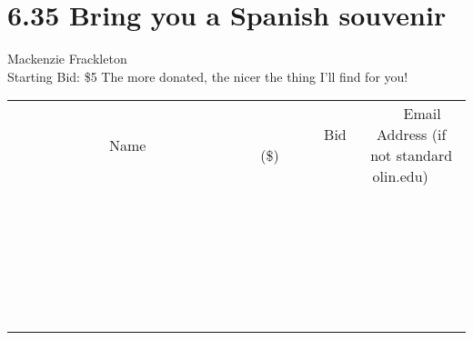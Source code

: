 \documentclass[11pt]{article}
\begin{document}
\section*{6.35 Bring you a Spanish souvenir }
Mackenzie Frackleton
\\
Starting Bid: \$5
\newline
The more donated, the nicer the thing I'll find for you!
\\[6ex]
\begin{tabular}{c c c}
~~~~~~~~~~~~~Name~~~~~~~~~~~~~ & ~~~~~~~~~Bid (\$)~~~~~~~~~  & ~~~Email Address (if not standard olin.edu)~~~\\
 & & \\
\hline
 & & \\
\hline
 & & \\
\hline
 & & \\
\hline
 & & \\
\hline
 & & \\
\hline
 & & \\
\hline
 & & \\
\hline
 & & \\
\hline
 & & \\
\hline
 & & \\
\hline
 & & \\
\hline
 & & \\
\hline
 & & \\
\hline
 & & \\
\hline
 & & \\
\hline
 & & \\
\hline
 & & \\
\hline
 & & \\
\hline
 & & \\
\hline
 & & \\
\hline
 & & \\
\hline
 & & \\
\hline
 & & \\
\hline
 & & \\
\hline
 & & \\
\hline
\end{tabular}
\newpage
\end{document}

